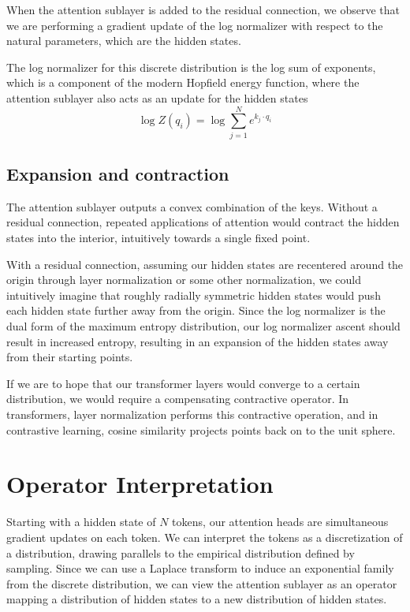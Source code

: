 \documentclass{article}
\begin{document}
When the attention sublayer is added to the residual connection, we observe that we are performing a gradient update of the log normalizer with respect to the natural parameters, which are the hidden states.

The log normalizer for this discrete distribution is the log sum of exponents, which is a component of the modern Hopfield energy function, where the attention sublayer also acts as an update for the hidden states
\begin{equation}
  \log Z(q_i) = \log \sum_{j=1}^N e^{ k_j \cdot q_i}
  \label{free energy}
\end{equation}

\subsection{Expansion and contraction}
\label{}

The attention sublayer outputs a convex combination of the keys. Without a residual connection, repeated applications of attention would contract the hidden states into the interior, intuitively towards a single fixed point.

With a residual connection, assuming our hidden states are recentered around the origin through layer normalization or some other normalization, we could intuitively imagine that roughly radially symmetric hidden states would push each hidden state further away from the origin.
Since the log normalizer is the dual form of the maximum entropy distribution, our log normalizer ascent should result in increased entropy, resulting in an expansion of the hidden states away from their starting points.

If we are to hope that our transformer layers would converge to a certain distribution, we would require a compensating contractive operator. In transformers, layer normalization performs this contractive operation, and in contrastive learning, cosine similarity projects points back on to the unit sphere.

\section{Operator Interpretation}
\label{operator interpretation}

Starting with a hidden state of $N$ tokens, our attention heads are simultaneous gradient updates on each token. 
We can interpret the tokens as a discretization of a distribution, drawing parallels to the empirical distribution defined by sampling. 
Since we can use a Laplace transform to induce an exponential family from the discrete distribution, we can view the attention sublayer as an operator mapping a distribution of hidden states to a new distribution of hidden states.
\end{document}
